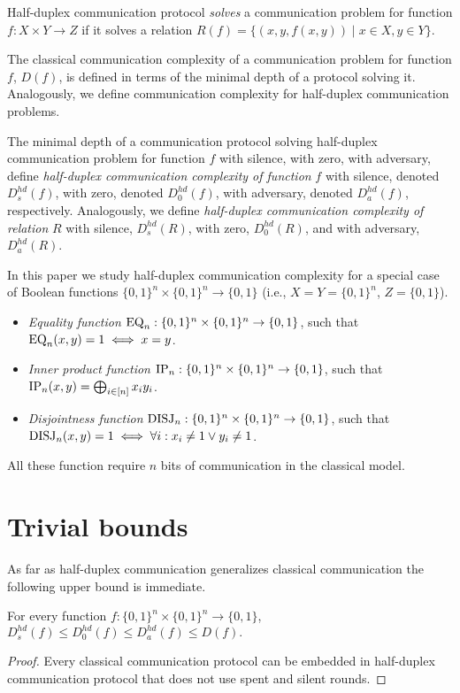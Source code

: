 \begin{definition}
Half-duplex communication protocol \emph{solves} a communication 
problem for function $f:X\times Y\to Z$ 
if it solves a relation $R(f) = \{(x,y,f(x,y))\mid x\in X, y\in Y\}$.
\end{definition}

The classical communication complexity of a communication problem for function $f$, $D(f)$, is defined
in terms of the minimal depth of a protocol solving it. Analogously, we define
communication complexity for half-duplex communication problems.
\begin{definition}
The minimal depth of a communication protocol solving half-duplex communication problem for function
$f$ with silence, with zero, with adversary, define \emph{half-duplex communication complexity of function}
$f$ with silence, denoted $D^{hd}_s(f)$, with zero, denoted $D^{hd}_0(f)$, with adversary, denoted
$D^{hd}_a(f)$, respectively. Analogously, we define \emph{half-duplex communication complexity of relation} $R$ with silence, $D^{hd}_s(R)$, with zero, $D^{hd}_0(R)$, and with adversary, $D^{hd}_a(R)$.
\end{definition}

In this paper we study half-duplex communication complexity for a special case of Boolean 
functions $\{0,1\}^n\times\{0,1\}^n\to \{0,1\}$ (i.e., $X=Y=\{0,1\}^n$, $Z=\{0,1\}$).
\begin{definition}\mbox{}
\begin{itemize}
	\item \emph{Equality function$  $} $\mathrm{EQ}_n: \{0,1\}^n\times\{0,1\}^n\to \{0,1\}$, such that $\mathrm{EQ}_n(x,y) = 1 \iff x=y$.
	\item \emph{Inner product function} $\mathrm{IP}_n:\{0,1\}^n\times\{0,1\}^n\to \{0,1\}$, such that $\mathrm{IP}_n(x,y) = \bigoplus_{i\in[n]} x_i y_i$.
	\item \emph{Disjointness function} $\mathrm{DISJ}_n:\{0,1\}^n\times\{0,1\}^n\to \{0,1\}$, such that 
	$\mathrm{DISJ}_n(x,y) = 1 \iff \forall i: x_i \neq 1 \lor y_i \neq 1$.
\end{itemize}
All these function require $n$ bits of communication in the classical model.
\end{definition}

\section{Trivial bounds}\label{sec:trivial-bounds}
As far as half-duplex communication generalizes classical 
communication the following upper bound is immediate.
\begin{theorem}\label{thm:trivial-ub}
For every function $f:\{0,1\}^n\times \{0,1\}^n \to \{0,1\}$,
$D^{hd}_s(f)\le D^{hd}_0(f)\le D^{hd}_a(f)\le D(f).$
\end{theorem}
\begin{proof}
Every classical communication protocol can be embedded in half-duplex communication protocol
that does not use spent and silent rounds.
\end{proof}

